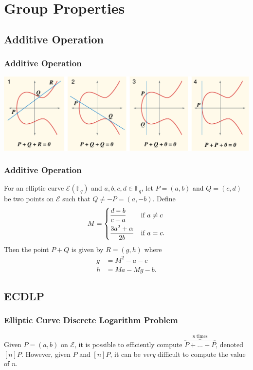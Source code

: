 \documentclass{beamer}
\begin{document}
    \section{Group Properties}
    \subsection{Additive Operation}
    \begin{frame}
        \frametitle{Additive Operation}
        \centering
        \includegraphics[width=\textwidth]{ECClines.pdf}
    \end{frame}

    \begin{frame}[label=add]
        \frametitle{Additive Operation}
        \begin{theorem}
            For an elliptic curve \(\mathcal{E}(\mathbb{F}_q)\)
            and \(a, b, c, d \in \mathbb{F}_q\),
            let \(P = (a, b)\) and \(Q = (c, d)\) be two points
            on \(\mathcal{E}\) such that \(Q \neq -P = (a, -b)\). Define
            \[M = 
                \begin{dcases}
                    \frac{d - b}{c - a} & \textnormal{if}\ a \neq c \\
                    \frac{3a^2 + \alpha}{2b} & \textnormal{if}\ a = c.
                \end{dcases}\]
            Then the point \(P + Q\) is given by \(R = (g, h)\) where
            \begin{align*}
                g &= M^2 - a - c \\
                h &= Ma - Mg - b.
            \end{align*}
        \end{theorem}
        \hyperlink{addproof}{}
    \end{frame}

    \subsection{ECDLP}
    \begin{frame}
        \frametitle{Elliptic Curve Discrete Logarithm Problem}
        Given \(P = (a, b)\) on \(\mathcal{E}\), it is possible to
        efficiently compute \(\overbrace{P + \dots + P}^{n\ \textrm{times}}\),
        denoted \([n]P\).
        \vfill
        However, given \(P\) and \([n]P\), it can be \emph{very} difficult to
        compute the value of \(n\).
    \end{frame}
\end{document}
